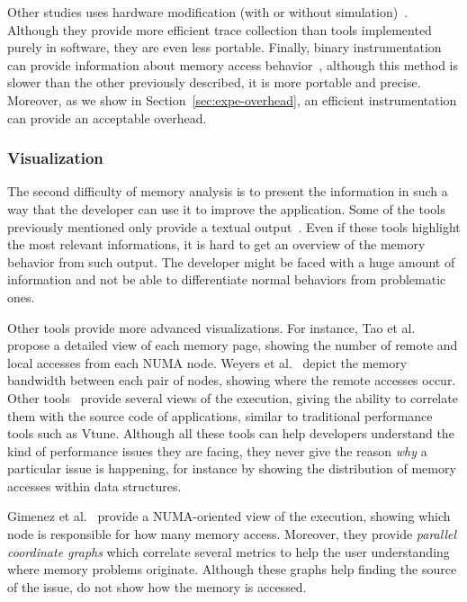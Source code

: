 Other studies uses hardware modification (with or without simulation)~\cite{Bao08HMTT,Martonosi92MemSpy}.
Although they provide more efficient trace collection than tools implemented purely in software, they are even less portable.
Finally, binary instrumentation can provide information about memory access behavior~\cite{DeRose02SIGMA}, although this method is slower than
the other previously described, it is more portable and precise. Moreover, as
we show in Section~\ref{sec:expe-overhead}, an efficient instrumentation can
provide an acceptable overhead.

\subsubsection{Visualization}

The second difficulty of memory analysis is to present the information in such
a way that the developer can use it to improve the application. Some of the tools
previously mentioned only provide a textual
output~\cite{Lachaize12MemProf,McCurdy2010,Martonosi92MemSpy}. Even if these
tools highlight the most relevant informations, it is hard to get an overview
of the memory behavior from such output. The developer might be faced with a huge
amount of information and not be able to differentiate normal behaviors from
problematic ones.


Other tools provide more advanced visualizations. For
instance, Tao et al.~\cite{Tao01Visualizing} propose a detailed view of each memory
page, showing the number of remote and local accesses from each NUMA node. Weyers et
al.~\cite{Weyers14Visualization} depict the memory bandwidth between each pair of nodes,
showing where the remote accesses occur. Other
tools~\cite{DeRose01Hardware,DeRose02SIGMA,Bosch00Rivet} provide several views
of the execution, giving the ability to correlate them with the source code of applications, similar to traditional performance tools such as Vtune. Although
all these tools can help developers understand the kind of
performance issues they are facing, they never give the reason \emph{why} a particular
issue is happening, for instance by showing the distribution of memory accesses within data structures.

Gimenez et al.~\cite{Gimenez14Dissecting} provide a NUMA-oriented view of the
execution, showing which node is responsible for how many memory access.
Moreover, they provide \emph{parallel coordinate graphs} which correlate
several metrics to help the user understanding where memory
problems originate. Although these graphs help finding
the source of the issue, do not show how the memory
is accessed.

